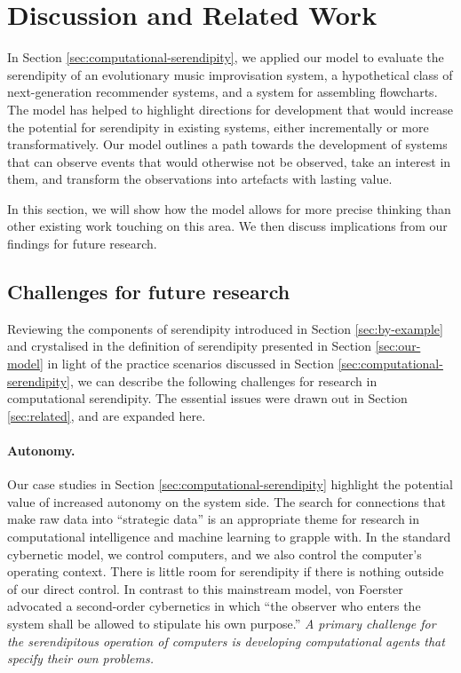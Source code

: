 \section{Discussion and Related Work} \label{sec:discussion}

In Section \ref{sec:computational-serendipity}, we applied our model
to evaluate the serendipity of an evolutionary music improvisation
system, a hypothetical class of next-generation recommender systems,
and a system for assembling flowcharts.  The model has helped to
highlight directions for development that would increase the potential
for serendipity in existing systems, either incrementally or more
transformatively.  Our model outlines a path towards the development
of systems that can observe events that would otherwise not be
observed, take an interest in them, and transform the observations
into artefacts with lasting value.

In this section, we will show how the model allows for more precise
thinking than other existing work touching on this area.  We then
discuss implications from our findings for future research.

%
%
%



\subsection{Challenges for future research} \label{sec:recommendations}

Reviewing the components of serendipity introduced in Section
\ref{sec:by-example} and crystalised in the definition of serendipity
presented in Section \ref{sec:our-model} in light of the practice
scenarios discussed in Section \ref{sec:computational-serendipity}, we
can describe the following challenges for research in computational
serendipity.  The essential issues were drawn out in Section \ref{sec:related}, and are expanded here.

\paragraph{\textbf{Autonomy}.} Our case studies in Section
  \ref{sec:computational-serendipity} highlight the potential value of
  increased autonomy on the system side.
The search for connections that make raw data into ``strategic data''
is an appropriate theme for research in computational intelligence and
machine learning to grapple with.  In the standard cybernetic model,
we control computers, and we also control the computer's operating
context.  There is little room for serendipity if there is nothing
outside of our direct control.  In contrast to this mainstream model,
von Foerster \citeyear[p. 286]{von2003cybernetics} advocated a
second-order cybernetics in which ``the observer who enters the system
shall be allowed to stipulate his own purpose.''  \emph{A
  primary challenge for the serendipitous operation of computers is
  developing computational agents that specify their own problems.}

